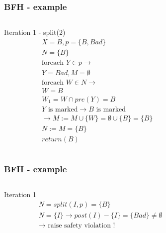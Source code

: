 \documentclass[11pt,handout]{beamer}
\begin{document}
\begin{frame}
  \frametitle{BFH - example}
  \begin{columns}
    \begin{column}{0.5\textwidth}
      Iteration 1 - split(2)
      \begin{align*}
        & X = B , p = \{B, Bad\} \\
        & N = \{B\}\\
        & \text{foreach $Y \in p$} \to \\
        & Y = Bad , M = \emptyset \\
        & \text{foreach $W \in N$} \to \\
        & W = B \\
        & W_1 = W \cap pre(Y) = B \\
        & Y \text{ is marked} \to B\text{ is marked} \\
        & \to M := M \cup \{W\} = \emptyset \cup \{B\} = \{B\} \\
        & N := M = \{B\} \\
        & return(B)
      \end{align*}
    \end{column}
    \begin{column}{0.5\textwidth}%
      
    \end{column}
  \end{columns}
\end{frame}

\begin{frame}
  \frametitle{BFH - example}
  \begin{columns}
    \begin{column}{0.5\textwidth}
      Iteration 1
      \begin{align*}
        & N = split(I,p) = \{B\} \\
        & N = \{I\} \to post(I) - \{I\} = \{Bad\} \neq \emptyset \\
        & \to \text{ raise safety violation !}
      \end{align*}
    \end{column}
    \begin{column}{0.5\textwidth}%
      
    \end{column}
  \end{columns}
\end{frame}
\end{document}
